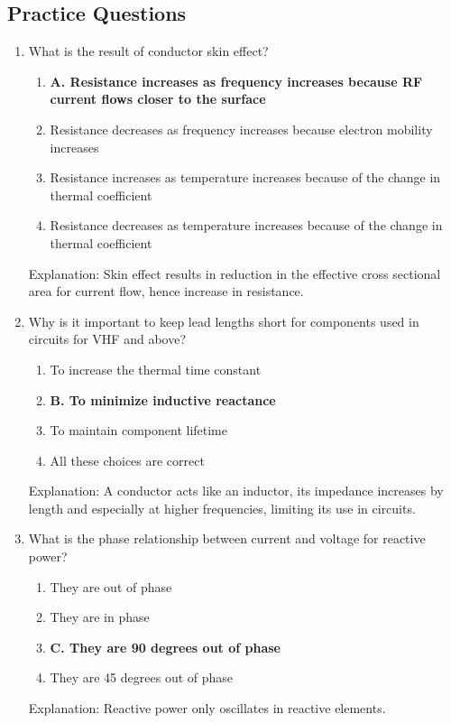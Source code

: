 \subsection*{Practice Questions}
\begin{enumerate}
    \item What is the result of conductor skin effect?
        \begin{enumerate}
        \item \textbf{A. Resistance increases as frequency increases because RF current flows closer to the surface}
        \item  Resistance decreases as frequency increases because electron mobility increases
         \item  Resistance increases as temperature increases because of the change in thermal coefficient
          \item  Resistance decreases as temperature increases because of the change in thermal coefficient
      \end{enumerate}
     \textcolor{myred}{Explanation:}
       Skin effect results in reduction in the effective cross sectional area for current flow, hence increase in resistance.

   \item Why is it important to keep lead lengths short for components used in circuits for VHF and above?
       \begin{enumerate}
        \item  To increase the thermal time constant
        \item \textbf{B. To minimize inductive reactance}
        \item  To maintain component lifetime
        \item  All these choices are correct
        \end{enumerate}
       \textcolor{myred}{Explanation:}
         A conductor acts like an inductor, its impedance increases by length and especially at higher frequencies, limiting its use in circuits.
         
    \item What is the phase relationship between current and voltage for reactive power?
       \begin{enumerate}
          \item  They are out of phase
          \item  They are in phase
       \item \textbf{C. They are 90 degrees out of phase}
     \item  They are 45 degrees out of phase
        \end{enumerate}
     \textcolor{myred}{Explanation:}
      Reactive power only oscillates in reactive elements.
       

\end{enumerate}

